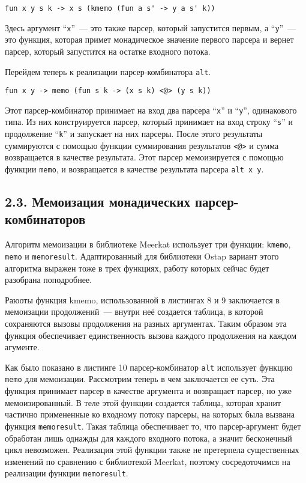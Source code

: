 \begin{lstlisting}[basicstyle=\small, numbers=none]
   fun x y s k -> x s (kmemo (fun a s' -> y a s' k))
\end{lstlisting}

Здесь аргумент ``\lstinline|х|''~--- это также парсер, который запустится первым, а ``\lstinline|y|''~--- это функция, которая примет монадическое значение первого парсера и вернет парсер, который запустится на остатке входного потока.

Перейдем теперь к реализации парсер-комбинатора \lstinline|alt|.

\begin{lstlisting}[basicstyle=\small, numbers=none]
   fun x y -> memo (fun s k -> (x s k) <@> (y s k))
\end{lstlisting}

Этот парсер-комбинатор принимает на вход два парсера ``\lstinline|x|'' и ``\lstinline|y|'', одинакового типа. Из них конструируется парсер, который принимает на вход строку ``\lstinline|s|'' и продолжение ``\lstinline|k|'' и запускает на них парсеры. После этого результаты суммируются с помощью функции суммирования результатов \lstinline|<@>| и сумма возвращается в качестве результата. Этот парсер мемоизируется с помощью функции \lstinline|memo|, и возвращается в качестве результата парсера \lstinline|alt x y|.

\subsection*{2.3. Мемоизация монадических парсер-комбинаторов}

Алгоритм мемоизации в библиотеке Meerkat использует три функции: \lstinline|kmemo|, \lstinline|memo| и \lstinline|memoresult|. Адаптированный для библиотеки Ostap вариант этого алгоритма выражен тоже в трех функциях, работу которых сейчас будет разобрана поподробнее.

Раюоты функция kmemo, использованной в листингах 8 и 9 заключается в мемоизации продолжений~--- внутри неё создается таблица, в которой сохраняются вызовы продолжения на разных аргументах. Таким образом эта функция обеспечивает единственность вызова каждого продолжения на каждом агументе.

Как было показано в листинге 10 парсер-комбинатор \lstinline|alt| использует функцию \lstinline|memo| для мемоизации. Рассмотрим теперь в чем заключается ее суть. Эта функция принимает парсер в качестве аргумента и возвращает парсер, но уже мемоизированный. В теле этой функции создается таблица, которая хранит частично примененные ко входному потоку парсеры, на которых была вызвана функция \lstinline|memoresult|. Такая таблица обеспечивает то, что парсер-аргумент будет обработан лишь однажды для каждого входного потока, а значит бесконечный цикл невозможен. Реализация этой функции также не претерпела существенных изменений по сравнению с библиотекой Meerkat, поэтому сосредоточимся на реализации функции \lstinline|memoresult|.


